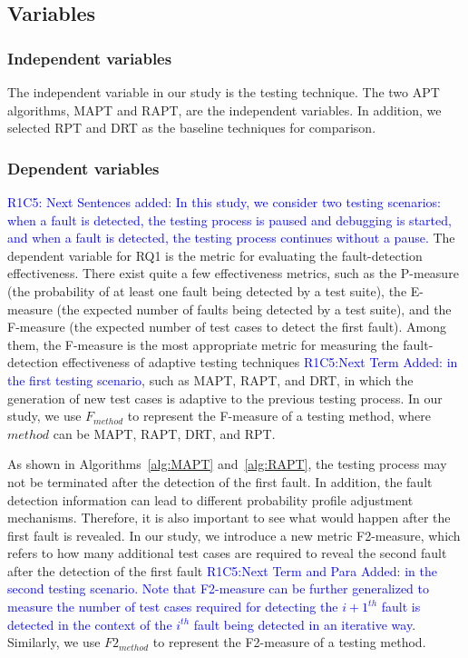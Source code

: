 \documentclass[10pt,journal,compsoc]{IEEEtran}
\begin{document}
\subsection{Variables}

\subsubsection{Independent variables}
The independent variable in our study is the testing technique. The two APT algorithms, MAPT and RAPT, are the independent variables. In addition, we selected RPT and DRT as the baseline techniques for comparison.

\subsubsection{Dependent variables}

\textcolor{blue}{R1C5: Next Sentences added: In this study, we consider two testing scenarios: when a fault is detected, the testing process is paused and debugging is started, and when a fault is detected, the testing process continues without a pause.}
The dependent variable for RQ1 is the metric for evaluating the fault-detection effectiveness. There exist quite a few effectiveness metrics, such as the P-measure (the probability of at least one fault being detected by a test suite), the E-measure (the expected number of faults being detected by a test suite), and the F-measure (the expected number of test cases to detect the first fault). Among them, the F-measure is the most appropriate metric for measuring the fault-detection effectiveness of adaptive testing techniques \textcolor{blue}{R1C5:Next Term Added: in the first testing scenario}, such as MAPT, RAPT, and DRT, in which the generation of new test cases is adaptive to the previous testing process. In our study, we use $F_{method}$ to represent the F-measure of a testing method, where $method$ can be MAPT, RAPT, DRT, and RPT.

As shown in Algorithms~\ref{alg:MAPT} and~\ref{alg:RAPT}, the testing process may not be terminated after the detection of the first fault. In addition, the fault detection information can lead to different probability profile adjustment mechanisms. Therefore, it is also important to see what would happen after the first fault is revealed. In our study, we introduce a new metric F2-measure, which refers to how many additional test cases are required to reveal the second fault after the detection of the first fault \textcolor{blue}{R1C5:Next Term and Para Added: in the second testing scenario. Note that F2-measure can be further generalized to measure the number of test cases required for detecting the ${i+1}^{th}$ fault is detected in the context of the $i^{th}$ fault being detected in an iterative way}. Similarly, we use $F2_{method}$ to represent the F2-measure of a testing method.
\end{document}
